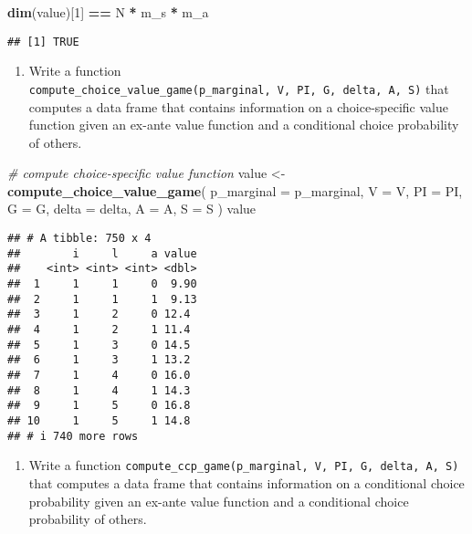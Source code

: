 \documentclass[
]{book}
\newenvironment{Shaded}{\begin{snugshade}}{\end{snugshade}}
\newcommand{\AttributeTok}[1]{\textcolor[rgb]{0.13,0.29,0.53}{#1}}
\newcommand{\CommentTok}[1]{\textcolor[rgb]{0.56,0.35,0.01}{\textit{#1}}}
\newcommand{\DecValTok}[1]{\textcolor[rgb]{0.00,0.00,0.81}{#1}}
\newcommand{\FunctionTok}[1]{\textcolor[rgb]{0.13,0.29,0.53}{\textbf{#1}}}
\newcommand{\NormalTok}[1]{#1}
\newcommand{\OtherTok}[1]{\textcolor[rgb]{0.56,0.35,0.01}{#1}}
\newcommand{\SpecialCharTok}[1]{\textcolor[rgb]{0.81,0.36,0.00}{\textbf{#1}}}
\providecommand{\tightlist}{%
  \setlength{\itemsep}{0pt}\setlength{\parskip}{0pt}}
\begin{document}
\begin{Shaded}
\begin{Highlighting}[]
\FunctionTok{dim}\NormalTok{(value)[}\DecValTok{1}\NormalTok{] }\SpecialCharTok{==}\NormalTok{ N }\SpecialCharTok{*}\NormalTok{ m\_s }\SpecialCharTok{*}\NormalTok{ m\_a}
\end{Highlighting}
\end{Shaded}

\begin{verbatim}
## [1] TRUE
\end{verbatim}

\begin{enumerate}
\def\labelenumi{\arabic{enumi}.}
\setcounter{enumi}{8}
\tightlist
\item
  Write a function \texttt{compute\_choice\_value\_game(p\_marginal,\ V,\ PI,\ G,\ delta,\ A,\ S)} that computes a data frame that contains information on a choice-specific value function given an ex-ante value function and a conditional choice probability of others.
\end{enumerate}

\begin{Shaded}
\begin{Highlighting}[]
\CommentTok{\# compute choice{-}specific value function}
\NormalTok{value }\OtherTok{\textless{}{-}} 
  \FunctionTok{compute\_choice\_value\_game}\NormalTok{(}
    \AttributeTok{p\_marginal =}\NormalTok{ p\_marginal,}
    \AttributeTok{V =}\NormalTok{ V,}
    \AttributeTok{PI =}\NormalTok{ PI,}
    \AttributeTok{G =}\NormalTok{ G, }
    \AttributeTok{delta =}\NormalTok{ delta, }
    \AttributeTok{A =}\NormalTok{ A, }
    \AttributeTok{S =}\NormalTok{ S}
\NormalTok{    )}
\NormalTok{value}
\end{Highlighting}
\end{Shaded}

\begin{verbatim}
## # A tibble: 750 x 4
##        i     l     a value
##    <int> <int> <int> <dbl>
##  1     1     1     0  9.90
##  2     1     1     1  9.13
##  3     1     2     0 12.4 
##  4     1     2     1 11.4 
##  5     1     3     0 14.5 
##  6     1     3     1 13.2 
##  7     1     4     0 16.0 
##  8     1     4     1 14.3 
##  9     1     5     0 16.8 
## 10     1     5     1 14.8 
## # i 740 more rows
\end{verbatim}

\begin{enumerate}
\def\labelenumi{\arabic{enumi}.}
\setcounter{enumi}{9}
\tightlist
\item
  Write a function \texttt{compute\_ccp\_game(p\_marginal,\ V,\ PI,\ G,\ delta,\ A,\ S)} that computes a data frame that contains information on a conditional choice probability given an ex-ante value function and a conditional choice probability of others.
\end{enumerate}
\end{document}
